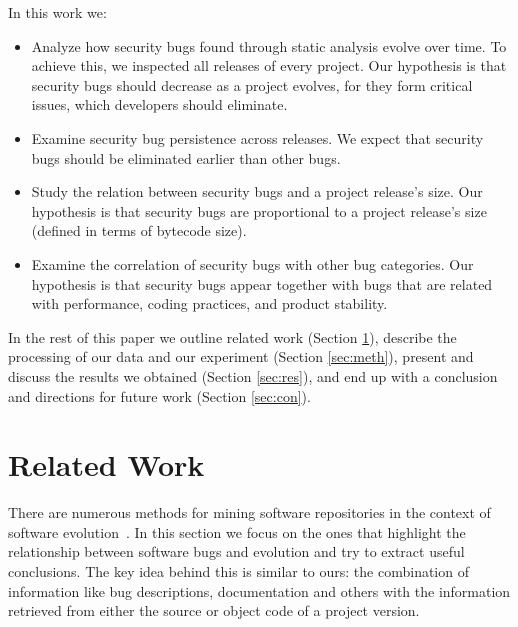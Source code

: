 \documentclass{sig-alternate}
\begin{document}
In this work we:
\begin{itemize}
	\item Analyze how security bugs found through static analysis
evolve over time. To achieve this, we inspected all releases of every project.
Our hypothesis is that security bugs should decrease as a project evolves,
for they form critical issues, which developers should eliminate.
	\item Examine security bug persistence across releases. 
We expect that security bugs should be eliminated earlier than other bugs.
	\item Study the relation between security bugs and a project
release's size. Our hypothesis is that security bugs are proportional to a project
release's size (defined in terms of bytecode size).
	\item Examine the correlation of security bugs with other bug categories.
Our hypothesis is that security bugs appear together with bugs that
are related with performance, coding practices, and product stability.
\end{itemize}

In the rest of this paper we
outline related work (Section \ref{sec:rel}),
describe the processing of our data and our experiment (Section \ref{sec:meth}),
present and discuss the results we obtained (Section \ref{sec:res}),
and end up with a conclusion and directions for future work (Section \ref{sec:con}).

\section{Related Work}
\label{sec:rel}

There are numerous methods for mining software repositories in the context
of software evolution~\cite{KCM07}. In this section we focus on the ones
that highlight the relationship between software bugs and evolution and try to
extract useful conclusions. The key idea behind this is
similar to ours: the combination of information like bug descriptions,
documentation and others with the information retrieved from either the source
or object code of a project version.
\end{document}
